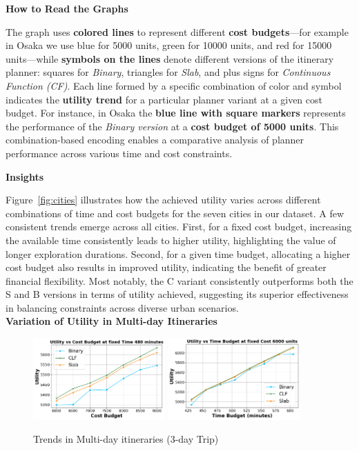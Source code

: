 \noindent \textbf{How to Read the Graphs}

\noindent The graph uses \textbf{colored lines} to represent different \textbf{cost budgets}—for example in Osaka we use blue for 5000 units, green for 10000 units, and red for 15000 units—while \textbf{symbols on the lines} denote different versions of the itinerary planner: squares for \textit{Binary}, triangles for \textit{Slab}, and plus signs for \textit{Continuous Function (CF)}. Each line formed by a specific combination of color and symbol indicates the \textbf{utility trend} for a particular planner variant at a given cost budget. For instance, in Osaka the \textbf{blue line with square markers} represents the performance of the \textit{Binary version} at a \textbf{cost budget of 5000 units}. This combination-based encoding enables a comparative analysis of planner performance across various time and cost constraints.

\noindent\textbf{Insights}

\noindent Figure~\ref{fig:cities} illustrates how the achieved utility varies across different combinations of time and cost budgets for the seven cities in our dataset. A few consistent trends emerge across all cities. First, for a fixed cost budget, increasing the available time consistently leads to higher utility, highlighting the value of longer exploration durations. Second, for a given time budget, allocating a higher cost budget also results in improved utility, indicating the benefit of greater financial flexibility. Most notably, the C variant consistently outperforms both the S and B versions in terms of utility achieved, suggesting its superior effectiveness in balancing constraints across diverse urban scenarios.\\

\noindent\textbf{Variation of Utility in Multi-day Itineraries}
\begin{figure}[th]
\includegraphics[width=0.45\textwidth]{plots/multiday1_pkj.png}
\includegraphics[width=0.45\textwidth]{plots/multiday2_pkj.png}
\caption{Trends in Multi-day itineraries (3-day Trip)}
\label{fig:util_md}
\end{figure}

